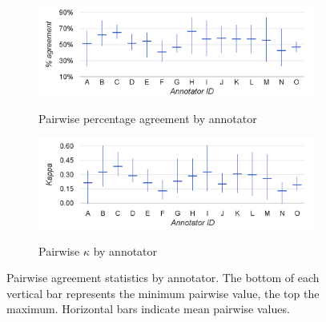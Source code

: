 		\begin{figure}[p]
			\centering
			
			\begin{subfigure}{\textwidth}
				\centering
				\caption{Pairwise percentage agreement by annotator}
				\includegraphics[width=\textwidth]{img/annotation/pairAgreeAnnotators-noTitle}
				\label{fig:agreement:annotators:pct}
			\end{subfigure}%

			
			\begin{subfigure}{\textwidth}
				\centering
				\caption{Pairwise $\kappa$ by annotator}
				\includegraphics[width=\textwidth]{img/annotation/pairKappaAnnotators-noTitle}
				\label{fig:agreement:annotators:k}
			\end{subfigure}%
			
			
			\caption[Pairwise agreement statistics by annotator]{Pairwise agreement statistics by annotator. The bottom of each vertical bar represents the minimum pairwise value, the top the maximum. Horizontal bars indicate mean pairwise values.}
			\label{fig:agreement:annotators}
		\end{figure}
		
